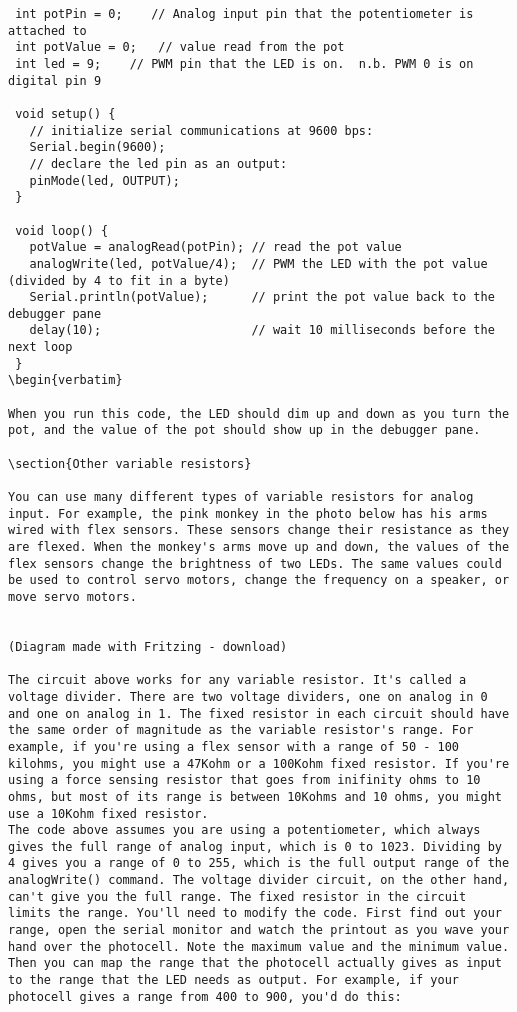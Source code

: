 \begin{verbatim}
 int potPin = 0;    // Analog input pin that the potentiometer is attached to
 int potValue = 0;   // value read from the pot
 int led = 9;    // PWM pin that the LED is on.  n.b. PWM 0 is on digital pin 9

 void setup() {
   // initialize serial communications at 9600 bps:
   Serial.begin(9600); 
   // declare the led pin as an output:
   pinMode(led, OUTPUT);
 }

 void loop() {
   potValue = analogRead(potPin); // read the pot value
   analogWrite(led, potValue/4);  // PWM the LED with the pot value (divided by 4 to fit in a byte)
   Serial.println(potValue);      // print the pot value back to the debugger pane
   delay(10);                     // wait 10 milliseconds before the next loop
 }
\begin{verbatim}

When you run this code, the LED should dim up and down as you turn the pot, and the value of the pot should show up in the debugger pane.

\section{Other variable resistors}

You can use many different types of variable resistors for analog input. For example, the pink monkey in the photo below has his arms wired with flex sensors. These sensors change their resistance as they are flexed. When the monkey's arms move up and down, the values of the flex sensors change the brightness of two LEDs. The same values could be used to control servo motors, change the frequency on a speaker, or move servo motors.


(Diagram made with Fritzing - download)

The circuit above works for any variable resistor. It's called a voltage divider. There are two voltage dividers, one on analog in 0 and one on analog in 1. The fixed resistor in each circuit should have the same order of magnitude as the variable resistor's range. For example, if you're using a flex sensor with a range of 50 - 100 kilohms, you might use a 47Kohm or a 100Kohm fixed resistor. If you're using a force sensing resistor that goes from inifinity ohms to 10 ohms, but most of its range is between 10Kohms and 10 ohms, you might use a 10Kohm fixed resistor.
The code above assumes you are using a potentiometer, which always gives the full range of analog input, which is 0 to 1023. Dividing by 4 gives you a range of 0 to 255, which is the full output range of the analogWrite() command. The voltage divider circuit, on the other hand, can't give you the full range. The fixed resistor in the circuit limits the range. You'll need to modify the code. First find out your range, open the serial monitor and watch the printout as you wave your hand over the photocell. Note the maximum value and the minimum value. Then you can map the range that the photocell actually gives as input to the range that the LED needs as output. For example, if your photocell gives a range from 400 to 900, you'd do this:



\end{verbatim}
